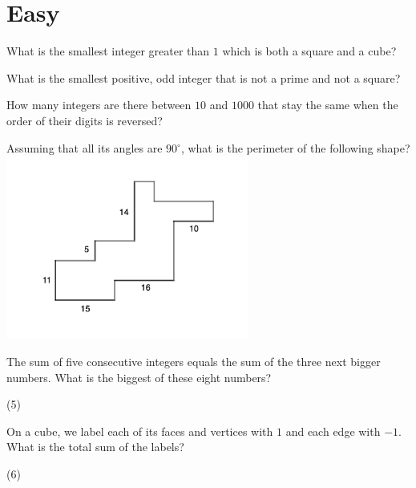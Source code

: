\documentclass{article}
\newcommand{\degree}{\ensuremath{^{\circ}}}
\begin{document}
\section{Easy}
\begin{problem}
What is the smallest integer greater than $1$ which is both a square and a cube?
\end{problem}

\begin{problem}
What is the smallest positive, odd integer that is not a prime and not a square?
\end{problem}


\begin{problem}
How many integers are there between $10$ and $1000$ that stay the same when the order of their digits is reversed?
\end{problem}

\begin{problem}
Assuming that all its angles are $90\degree$, what is the perimeter of the following shape? \\
\includegraphics[width = 8cm]{img10.png}
\end{problem}

\begin{problem}
The sum of five consecutive integers equals the sum of the three next bigger numbers. What is the biggest of these eight numbers?
\end{problem}
\begin{tasks}(5)
\end{tasks}

\begin{problem}
On a cube, we label each of its faces and vertices with $1$ and each edge with $-1$. What is the total sum of the labels?
\end{problem}
\begin{tasks}(6)
\end{tasks}
\end{document}
